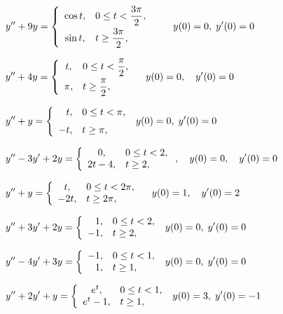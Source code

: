 \begin{exerciselist}
  \item\label{exer:8.5.8} $\displaystyle{y''+9y=\left\{\begin{array}{cl}\cos t,&0\le t<\displaystyle{\frac{3\pi}{2}},\\[2\jot]\sin t,&t\ge\displaystyle{\frac{3\pi}{2}},\end{array}\right.\qquad y(0)=0,\;y'(0)=0}$

  \item\label{exer:8.5.9} \CGex $\displaystyle{y''+4y=\left\{\begin{array}{cl}t,&0\le t<\displaystyle\frac{\pi}{2},\\[2\jot]\pi,&t\ge\displaystyle{\frac{\pi}{2}},\end{array}\right.\quad y(0)=0,\quad y'(0)=0}$

  \item\label{exer:8.5.10} $\displaystyle{y''+y=\left\{\begin{array}{cl}\phantom{-}t,&0\le t<\pi, \\[2\jot]-t,&t\ge\pi,\end{array}\right.\;y(0)=0,\;y'(0)=0}$

  \item\label{exer:8.5.11} $\displaystyle{y''-3y'+2y=\left\{\begin{array}{cl}0,&0\le t<2,\\2t-4,&t\ge2,\end{array}\right.,\quad y(0)=0,\quad y'(0)=0}$

  \item\label{exer:8.5.12} $\displaystyle{y''+y=\left\{\begin{array}{cl}t,&0\le t<2\pi,\\-2t,&t\ge2\pi,\end{array}\right.\quad y(0)=1,\quad y'(0)=2}$

  \item\label{exer:8.5.13} \CGex $\displaystyle{y''+3y'+2y=\left\{\begin{array}{cl}\phantom{-}1,&0\le t<2,\\-1,&t\ge2,\end{array}\right.\;y(0)=0,\;y'(0)=0}$

  \item\label{exer:8.5.14} $\displaystyle{y''-4y'+3y=\left\{\begin{array}{cl}-1,&0\le t<1,\\\phantom{-}1,&t\ge1,\end{array}\right.\;y(0)=0,\;y'(0)=0}$

  \item\label{exer:8.5.15} $\displaystyle{y''+2y'+y=\left\{\begin{array}{cl}e^{t},&0\le t<1,\\e^{t}-1,&t\ge1,\end{array}\right.\;y(0)=3,\; y'(0)=-1}$


\end{exerciselist}
